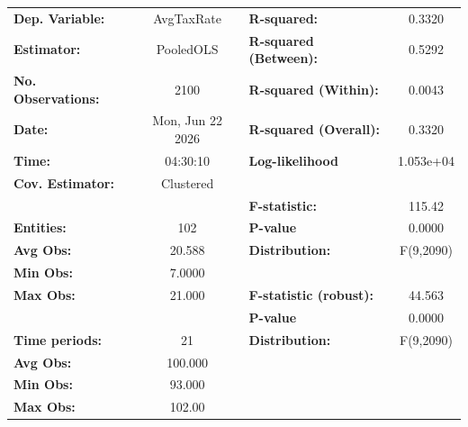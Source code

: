 \begin{center}
\begin{tabular}{lclc}
\toprule
\textbf{Dep. Variable:}                       &     AvgTaxRate     & \textbf{  R-squared:         }   &      0.3320      \\
\textbf{Estimator:}                           &     PooledOLS      & \textbf{  R-squared (Between):}  &      0.5292      \\
\textbf{No. Observations:}                    &        2100        & \textbf{  R-squared (Within):}   &      0.0043      \\
\textbf{Date:}                                &  Mon, Jun 22 2026  & \textbf{  R-squared (Overall):}  &      0.3320      \\
\textbf{Time:}                                &      04:30:10      & \textbf{  Log-likelihood     }   &    1.053e+04     \\
\textbf{Cov. Estimator:}                      &     Clustered      & \textbf{                     }   &                  \\
\textbf{}                                     &                    & \textbf{  F-statistic:       }   &      115.42      \\
\textbf{Entities:}                            &        102         & \textbf{  P-value            }   &      0.0000      \\
\textbf{Avg Obs:}                             &       20.588       & \textbf{  Distribution:      }   &    F(9,2090)     \\
\textbf{Min Obs:}                             &       7.0000       & \textbf{                     }   &                  \\
\textbf{Max Obs:}                             &       21.000       & \textbf{  F-statistic (robust):} &      44.563      \\
\textbf{}                                     &                    & \textbf{  P-value            }   &      0.0000      \\
\textbf{Time periods:}                        &         21         & \textbf{  Distribution:      }   &    F(9,2090)     \\
\textbf{Avg Obs:}                             &      100.000       & \textbf{                     }   &                  \\
\textbf{Min Obs:}                             &       93.000       & \textbf{                     }   &                  \\
\textbf{Max Obs:}                             &       102.00       & \textbf{                     }   &                  \\

\end{tabular}
\end{center}
